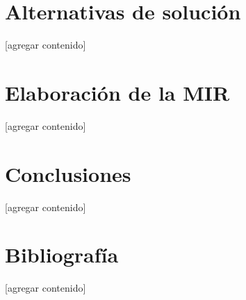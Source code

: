 \documentclass{article}
\begin{document}
\section{Alternativas de solución}\label{sec:alternatives}
[agregar contenido]

\section{Elaboración de la MIR}\label{sec:mir}
[agregar contenido]

\section{Conclusiones}\label{sec:conclutions}
[agregar contenido]

\section{Bibliografía}\label{sec:references}
[agregar contenido]
\end{document}
